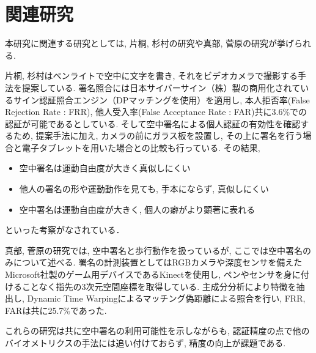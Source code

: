 \chapter{関連研究}\label{related_work.tex}

本研究に関連する研究としては, 片桐, 杉村の研究\cite{cite_2}\cite{cite_3}や真部, 菅原の研究\cite{cite_4}が挙げられる. 

片桐, 杉村はペンライトで空中に文字を書き, それをビデオカメラで撮影する手法を提案している. 署名照合には日本サイバーサイン（株）製の商用化されているサイン認証照合エンジン（DPマッチングを使用）を適用し, 本人拒否率(False Rejection Rate : FRR), 他人受入率(False Acceptance Rate : FAR)共に3.6\%での認証が可能であるとしている. そして空中署名による個人認証の有効性を確認するため, 提案手法に加え, カメラの前にガラス板を設置し, その上に署名を行う場合と電子タブレットを用いた場合との比較も行っている. その結果,
\\
\begin{itemize}
  \item{空中署名は運動自由度が大きく真似しにくい}
  \item{他人の署名の形や運動動作を見ても, 手本にならず, 真似しにくい}
  \item{空中署名は運動自由度が大きく, 個人の癖がより顕著に表れる}\\
\end{itemize}
といった考察がなされている．

真部, 菅原の研究では, 空中署名と歩行動作を扱っているが, ここでは空中署名のみについて述べる. 署名の計測装置としてはRGBカメラや深度センサを備えたMicrosoft社製のゲーム用デバイスであるKinectを使用し, ペンやセンサを身に付けることなく指先の3次元空間座標を取得している. 主成分分析により特徴を抽出し, Dynamic Time Warpingによるマッチング偽距離による照合を行い, FRR, FARは共に25.7\%であった.

これらの研究は共に空中署名の利用可能性を示しながらも, 認証精度の点で他のバイオメトリクスの手法には追い付けておらず, 精度の向上が課題である.